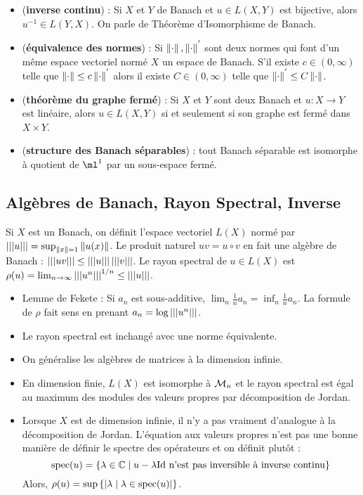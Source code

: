 \documentclass{cours}
\begin{document}
\begin{corollary}
    \begin{itemize}
        \item (\textbf{inverse continu}) : Si $X$ et $Y$ de Banach et $u\in L(X, Y)$ est bijective, alors $u^{-1} \in L(Y, X)$. On parle de Théorème d'Isomorphisme de Banach.
        \item (\textbf{équivalence des normes}) : Si $\left\lVert \cdot \right\rVert, \left\lVert \cdot \right\rVert^{'}$ sont deux normes qui font d'un même espace vectoriel normé $X$ un espace de Banach. S'il existe $c \in \left(0, \infty\right)$ telle que $\left\lVert \cdot \right\rVert \leq c\left\lVert \cdot \right\rVert^{'}$ alors il existe $C \in \left(0, \infty\right)$ telle que $\left\lVert \cdot \right\rVert^{'} \leq C \left\lVert \cdot \right\rVert$.
        \item (\textbf{théorème du graphe fermé}) : Si $X$ et $Y$ sont deux Banach et $u : X \to Y$ est linéaire, alors $u \in L(X, Y)$ si et seulement si son graphe est fermé dans $X \times Y$.
        \item (\textbf{structure des Banach séparables}) : tout Banach séparable est isomorphe à quotient de $\ml^{1}$ par un sous-espace fermé.
    \end{itemize}
\end{corollary}

\subsection{Algèbres de Banach, Rayon Spectral, Inverse}
\begin{definition}
    Si $X$ est un Banach, on définit l'espace vectoriel $L(X)$ normé par $\left| \left| \left| u \right| \right| \right| = \sup_{\left\lVert x \right\rVert = 1} \left\lVert u(x) \right\rVert$. Le produit naturel $uv = u \circ v$ en fait une algèbre de Banach : $\left| \left| \left| uv \right| \right| \right| \leq \left| \left| \left| u \right| \right| \right| \left| \left| \left| v \right| \right| \right|$. Le rayon spectral de $u \in L(X)$ est $\rho(u) = \lim_{n \to \infty} \left| \left| \left| u^{n} \right| \right| \right|^{1/n} \leq \left| \left| \left| u \right| \right| \right|$.
\end{definition}
\begin{remark}
    \begin{itemize}
        \item Lemme de Fekete : Si $a_{n}$ est sous-additive, $\lim_{n} \frac{1}{n} a_{n} = \inf_{n} \frac{1}{n} a_{n}$. La formule de $\rho$ fait sens en prenant $a_{n} = \log \left| \left| \left| u^{n} \right| \right| \right|$.
        \item Le rayon spectral est inchangé avec une norme équivalente.
        \item On généralise les algèbres de matrices à la dimension infinie. 
        \item En dimension finie, $L(X)$ est isomorphe à $\mathcal{M}_{n}$ et le rayon spectral est égal au maximum des modules des valeurs propres par décomposition de Jordan.
        \item Lorsque $X$ est de dimension infinie, il n'y a pas vraiment d'analogue à la décomposition de Jordan. L'équation aux valeurs propres n'est pas une bonne manière de définir le spectre des opérateurs et on définit plutôt : \[\text{spec}(u) = \left\{\lambda \in \mathbb{C} \mid u - \lambda\mathrm{Id} \text{ n'est pas inversible à inverse continu} \right\}\] Alors, $\rho(u) = \sup \left\{\left|\lambda \mid \lambda \in \text{spec}(u)\right|\right\}$.
    \end{itemize}
\end{remark}
\end{document}
